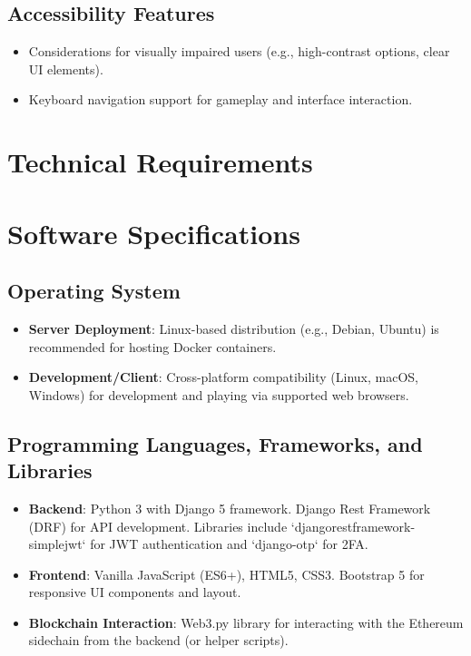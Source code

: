 \subsection*{Accessibility Features}
\begin{itemize}
    \item Considerations for visually impaired users (e.g., high-contrast options, clear UI elements).
    \item Keyboard navigation support for gameplay and interface interaction.
\end{itemize}

\section{Technical Requirements}
\section*{Software Specifications}

\subsection*{Operating System}
\begin{itemize}
    \item \textbf{Server Deployment}: Linux-based distribution (e.g., Debian, Ubuntu) is recommended for hosting Docker containers.
    \item \textbf{Development/Client}: Cross-platform compatibility (Linux, macOS, Windows) for development and playing via supported web browsers.
\end{itemize}

\subsection*{Programming Languages, Frameworks, and Libraries}
\begin{itemize}
    \item \textbf{Backend}: Python 3 with Django 5 framework. Django Rest Framework (DRF) for API development. Libraries include `djangorestframework-simplejwt` for JWT authentication and `django-otp` for 2FA.
    \item \textbf{Frontend}: Vanilla JavaScript (ES6+), HTML5, CSS3. Bootstrap 5 for responsive UI components and layout.
    \item \textbf{Blockchain Interaction}: Web3.py library for interacting with the Ethereum sidechain from the backend (or helper scripts).
\end{itemize}

